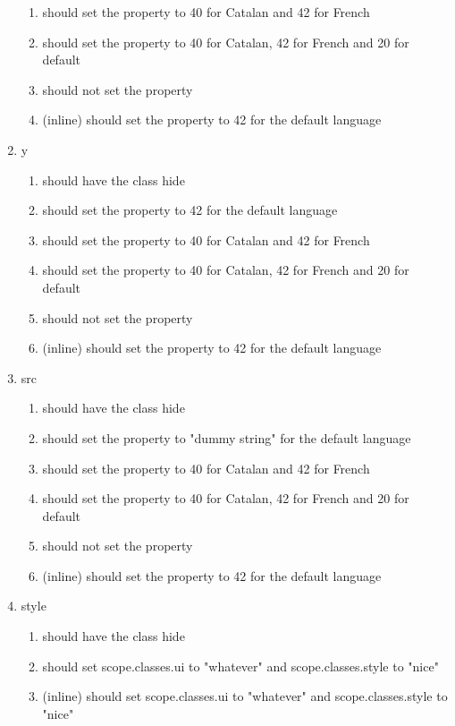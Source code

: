 \begin{singlespace}
\begin{enumerate}
\begin{enumerate}
\item         should set the property to 40 for Catalan and 42 for French
\item         should set the property to 40 for Catalan, 42 for French and 20 for default
\item         should not set the property
\item         (inline) should set the property to 42 for the default language
\end{enumerate}
\item     y
\begin{enumerate}
\item         should have the class hide
\item         should set the property to 42 for the default language
\item         should set the property to 40 for Catalan and 42 for French
\item         should set the property to 40 for Catalan, 42 for French and 20 for default
\item         should not set the property
\item         (inline) should set the property to 42 for the default language
\end{enumerate}
\item     src
\begin{enumerate}
\item         should have the class hide
\item         should set the property to "dummy string" for the default language
\item         should set the property to 40 for Catalan and 42 for French
\item         should set the property to 40 for Catalan, 42 for French and 20 for default
\item         should not set the property
\item         (inline) should set the property to 42 for the default language
\end{enumerate}
\item     style
\begin{enumerate}
\item         should have the class hide
\item         should set scope.classes.ui to "whatever" and scope.classes.style to "nice"
\item         (inline) should set scope.classes.ui to "whatever" and scope.classes.style to "nice"
\end{enumerate}

\end{enumerate}
\end{singlespace}
